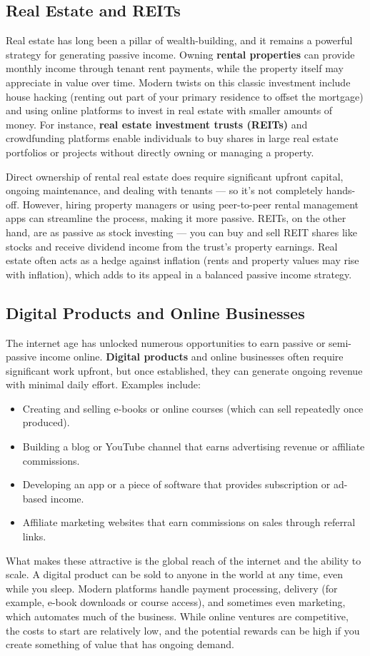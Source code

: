 \documentclass[12pt]{article}
\begin{document}
\subsection{Real Estate and REITs}
Real estate has long been a pillar of wealth-building, and it remains a powerful strategy for generating passive income. Owning \textbf{rental properties} can provide monthly income through tenant rent payments, while the property itself may appreciate in value over time. Modern twists on this classic investment include house hacking (renting out part of your primary residence to offset the mortgage) and using online platforms to invest in real estate with smaller amounts of money. For instance, \textbf{real estate investment trusts (REITs)} and crowdfunding platforms enable individuals to buy shares in large real estate portfolios or projects without directly owning or managing a property.
\par
Direct ownership of rental real estate does require significant upfront capital, ongoing maintenance, and dealing with tenants --- so it's not completely hands-off. However, hiring property managers or using peer-to-peer rental management apps can streamline the process, making it more passive. REITs, on the other hand, are as passive as stock investing --- you can buy and sell REIT shares like stocks and receive dividend income from the trust's property earnings. Real estate often acts as a hedge against inflation (rents and property values may rise with inflation), which adds to its appeal in a balanced passive income strategy.
\subsection{Digital Products and Online Businesses}
The internet age has unlocked numerous opportunities to earn passive or semi-passive income online. \textbf{Digital products} and online businesses often require significant work upfront, but once established, they can generate ongoing revenue with minimal daily effort. Examples include:
\begin{itemize}
    \item Creating and selling e-books or online courses (which can sell repeatedly once produced).
    \item Building a blog or YouTube channel that earns advertising revenue or affiliate commissions.
    \item Developing an app or a piece of software that provides subscription or ad-based income.
    \item Affiliate marketing websites that earn commissions on sales through referral links.
\end{itemize}
What makes these attractive is the global reach of the internet and the ability to scale. A digital product can be sold to anyone in the world at any time, even while you sleep. Modern platforms handle payment processing, delivery (for example, e-book downloads or course access), and sometimes even marketing, which automates much of the business. While online ventures are competitive, the costs to start are relatively low, and the potential rewards can be high if you create something of value that has ongoing demand.
\end{document}
